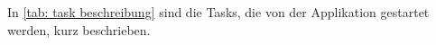 \documentclass[./\jobname.tex]{subfiles}
\begin{document}
\begin{figure}[H]
	\centering
	\noindent{}
	\label{fig: ClassDiagram_implementation.pdf}
\end{figure}
%
In \autoref{tab: task beschreibung} sind die Tasks, die von der Applikation gestartet werden, kurz beschrieben.
%
\end{document}
